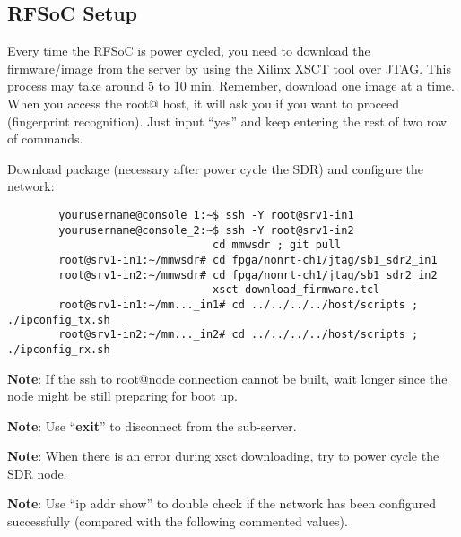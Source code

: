 \documentclass{article}
\begin{document}
    \subsection{RFSoC Setup}
        Every time the RFSoC is power cycled, you need to download the firmware/image from the server by using the Xilinx XSCT tool over JTAG. This process may take around 5 to 10 min. Remember, download one image at a time. When you access the root@ host, it will ask you if you want to proceed (fingerprint recognition). Just input ``yes'' and keep entering the rest of two row of commands. 
        
        \vspace{2em}
        Download package (necessary after power cycle the SDR) and configure the network:
        \begin{verbatim}
        yourusername@console_1:∼$ ssh -Y root@srv1-in1
        yourusername@console_2:∼$ ssh -Y root@srv1-in2
                                cd mmwsdr ; git pull
        root@srv1-in1:∼/mmwsdr# cd fpga/nonrt-ch1/jtag/sb1_sdr2_in1
        root@srv1-in2:∼/mmwsdr# cd fpga/nonrt-ch1/jtag/sb1_sdr2_in2
                                xsct download_firmware.tcl
        root@srv1-in1:∼/mm..._in1# cd ../../../../host/scripts ; ./ipconfig_tx.sh
        root@srv1-in2:∼/mm..._in2# cd ../../../../host/scripts ; ./ipconfig_rx.sh
        \end{verbatim}
        
        
        \textbf{Note}: If the ssh to root@node connection cannot be built, wait longer since the node might be still preparing for boot up. 
        
        \textbf{Note}: Use ``\textbf{exit}'' to disconnect from the sub-server. 
        
        \textbf{Note}: When there is an error during xsct downloading, try to power cycle the SDR node. 
        
        \textbf{Note}: Use ``ip addr show'' to double check if the network has been configured successfully (compared with the following commented values). 
        
\end{document}

